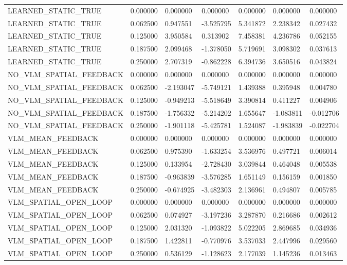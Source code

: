 \begin{tabular}{lllllll}
LEARNED\_STATIC\_TRUE & 0.000000 & 0.000000 & 0.000000 & 0.000000 & 0.000000 & 0.000000 \\
LEARNED\_STATIC\_TRUE & 0.062500 & 0.947551 & -3.525795 & 5.341872 & 2.238342 & 0.027432 \\
LEARNED\_STATIC\_TRUE & 0.125000 & 3.950584 & 0.313902 & 7.458381 & 4.236786 & 0.052155 \\
LEARNED\_STATIC\_TRUE & 0.187500 & 2.099468 & -1.378050 & 5.719691 & 3.098302 & 0.037613 \\
LEARNED\_STATIC\_TRUE & 0.250000 & 2.707319 & -0.862228 & 6.394736 & 3.650516 & 0.043824 \\
NO\_VLM\_SPATIAL\_FEEDBACK & 0.000000 & 0.000000 & 0.000000 & 0.000000 & 0.000000 & 0.000000 \\
NO\_VLM\_SPATIAL\_FEEDBACK & 0.062500 & -2.193047 & -5.749121 & 1.439388 & 0.395948 & 0.004780 \\
NO\_VLM\_SPATIAL\_FEEDBACK & 0.125000 & -0.949213 & -5.518649 & 3.390814 & 0.411227 & 0.004906 \\
NO\_VLM\_SPATIAL\_FEEDBACK & 0.187500 & -1.756332 & -5.214202 & 1.655647 & -1.083811 & -0.012706 \\
NO\_VLM\_SPATIAL\_FEEDBACK & 0.250000 & -1.901118 & -5.425781 & 1.524087 & -1.983839 & -0.022704 \\
VLM\_MEAN\_FEEDBACK & 0.000000 & 0.000000 & 0.000000 & 0.000000 & 0.000000 & 0.000000 \\
VLM\_MEAN\_FEEDBACK & 0.062500 & 0.975390 & -1.633254 & 3.536976 & 0.497721 & 0.006014 \\
VLM\_MEAN\_FEEDBACK & 0.125000 & 0.133954 & -2.728430 & 3.039844 & 0.464048 & 0.005538 \\
VLM\_MEAN\_FEEDBACK & 0.187500 & -0.963839 & -3.576285 & 1.651149 & 0.156159 & 0.001850 \\
VLM\_MEAN\_FEEDBACK & 0.250000 & -0.674925 & -3.482303 & 2.136961 & 0.494807 & 0.005785 \\
VLM\_SPATIAL\_OPEN\_LOOP & 0.000000 & 0.000000 & 0.000000 & 0.000000 & 0.000000 & 0.000000 \\
VLM\_SPATIAL\_OPEN\_LOOP & 0.062500 & 0.074927 & -3.197236 & 3.287870 & 0.216686 & 0.002612 \\
VLM\_SPATIAL\_OPEN\_LOOP & 0.125000 & 2.031320 & -1.093822 & 5.022205 & 2.869685 & 0.034936 \\
VLM\_SPATIAL\_OPEN\_LOOP & 0.187500 & 1.422811 & -0.770976 & 3.537033 & 2.447996 & 0.029560 \\
VLM\_SPATIAL\_OPEN\_LOOP & 0.250000 & 0.536129 & -1.128623 & 2.177039 & 1.145236 & 0.013463 \\
\hline
\end{tabular}
